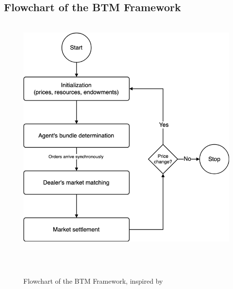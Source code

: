 \subsection{Flowchart of the BTM Framework}
\label{appendix:flowchart_btm}

\begin{figure}[htbp]
    \centering
    \includegraphics[width=0.8\linewidth]{./figures/btm_flowchart.png}
    \caption{Flowchart of the BTM Framework, inspired by \protect{}}
    \label{figure:btm_flowchart}
\end{figure}

\clearpage
